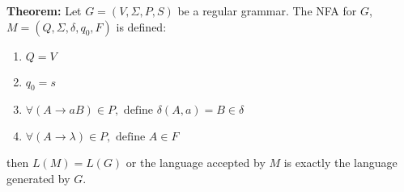 \documentclass{scrartcl}
\begin{document}
\textbf{Theorem:} Let $G=(V,\Sigma,P,S)$ be a regular grammar. The NFA for $G$, $M=(Q,\Sigma,\delta,q_0,F)$ is defined:
\begin{enumerate}
\item $Q=V$
\item $q_0=s$
\item $\forall (A \rightarrow aB) \in P, \text{ define } \delta(A,a) = B \in \delta$
\item $\forall (A \rightarrow \lambda) \in P, \text{ define } A \in F$
\end{enumerate}
then $L(M)=L(G)$ or the language accepted by $M$ is exactly the language generated by $G$.
\end{document}
